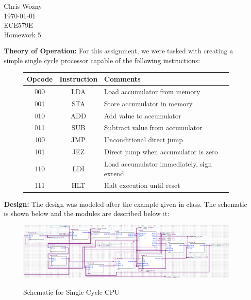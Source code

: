 \documentclass{article}         %
\begin{document}
\flushright
Chris Wozny\\
\today\\
ECE579E\\
Homework 5\\
\flushleft

\textbf{Theory of Operation:} For this assignment, we were tasked with creating a simple single cycle processor capable of the following instructions:\\

\begin{figure}[H]
\begin{center}
\begin{tabular}{ |c|c|l| }\hline
  \textbf{Opcode} & \textbf{Instruction} & \textbf{Comments} \\\hline
  000 & LDA & Load accumulator from memory\\\hline
  001 & STA & Store accumulator in memory\\\hline
  010 & ADD & Add value to accumulator \\\hline
  011 & SUB & Subtract value from accumulator \\\hline
  100 & JMP & Unconditional direct jump \\\hline
  101 & JEZ & Direct jump when accumulator is zero \\\hline
  110 & LDI & Load accumulator immediately, sign extend \\\hline
  111 & HLT & Halt execution until reset \\\hline
\end{tabular}
\end{center}
\end{figure}

\textbf{Design:} The design was modeled after the example given in class. The schematic is shown below and the modules are described below it:\\

\begin{figure}[H]
\begin{center}
\includegraphics[scale=0.3]{schematic.png}\\
\end{center}
\caption{Schematic for Single Cycle CPU}
\end{figure}
\end{document}
